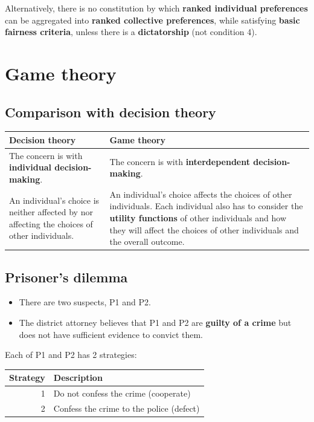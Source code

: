 \documentclass[11pt]{article}
\begin{document}
Alternatively, there is no constitution by which \textbf{ranked individual preferences} can be aggregated into \textbf{ranked collective preferences}, while satisfying \textbf{basic fairness criteria}, unless there is a \textbf{dictatorship} (not condition 4).
\section{Game theory}
\label{sec:org6bf5b84}

\subsection{Comparison with decision theory}
\label{sec:orgcf52052}
\begin{center}
\begin{tabularx}{\textwidth}{|X|X|}
\hline
Decision theory & Game theory\\
\hline
The concern is with \textbf{individual decision-making}. & The concern is with \textbf{interdependent decision-making}.\\
\hline
An individual's choice is neither affected by nor affecting the choices of other individuals. & An individual's choice affects the choices of other individuals. Each individual also has to consider the \textbf{utility functions} of other individuals and how they will affect the choices of other individuals and the overall outcome.\\
\hline
\end{tabularx}
\end{center}
\subsection{Prisoner's dilemma}
\label{sec:org5537053}
\begin{itemize}
\item There are two suspects, P1 and P2.
\item The district attorney believes that P1 and P2 are \textbf{guilty of a crime} but does not have sufficient evidence to convict them.
\end{itemize}

Each of P1 and P2 has 2 strategies:
\begin{center}
\begin{tabular}{r|l}
Strategy & Description\\
\hline
1 & Do not confess the crime (cooperate)\\
2 & Confess the crime to the police (defect)\\
\end{tabular}
\end{center}
\end{document}
